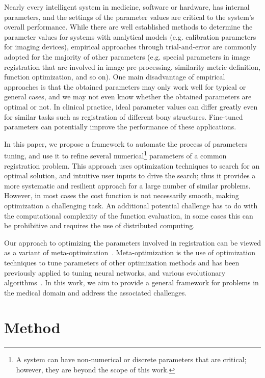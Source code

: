 \documentclass[]{spie}  %
\begin{document}
Nearly every intelligent system in medicine, software or hardware, has internal parameters, and the settings of the parameter values are critical to the system's overall performance. While there are well established methods to determine the parameter values for systems with analytical models (e.g. calibration parameters for imaging devices), empirical approaches through trial-and-error are commonly adopted for the majority of other parameters (e.g. special parameters in image registration that are involved in image pre-processing, similarity metric definition, function optimization, and so on). One main disadvantage of empirical approaches is that the obtained parameters may only work well for typical or general cases, and we may not even know whether the obtained parameters are optimal or not. In clinical practice, ideal parameter values can differ greatly even for similar tasks such as registration of different bony structures. Fine-tuned parameters can potentially improve the performance of these applications.

In this paper, we propose a framework to automate the process of parameters tuning, and use it to refine several numerical\footnote{A system can have non-numerical or discrete parameters that are critical; however, they are beyond the scope of this work.} parameters of a common registration problem. This approach uses optimization techniques to search for an optimal solution, and intuitive user inputs to drive the search; thus it provides a more systematic and resilient approach for a large number of similar problems. However, in most cases the cost function is not necessarily smooth, making optimization a challenging task. An additional potential challenge has to do with the computational complexity of the function evaluation, in some cases this can be prohibitive and requires the use of distributed computing.

Our approach to optimizing the parameters involved in registration can be viewed as a variant of meta-optimization~\cite{metaopt}. Meta-optimization is the use of optimization techniques to tune parameters of other optimization methods and has been previously applied to tuning neural networks, and various evolutionary algorithms~\cite{smit09:ece}. In this work, we aim to provide a general framework for problems in the medical domain and address the associated challenges.

\section{Method} 
\end{document}
